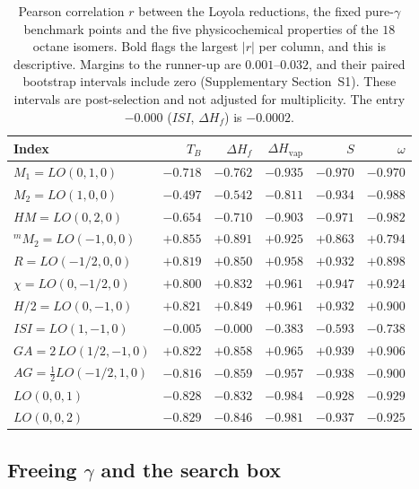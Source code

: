 \documentclass[a5paper, 10pt]{article}
\theoremstyle{plain}
\theoremstyle{remark}
\theoremstyle{definition}
\begin{document}
\begin{table}[htbp]
\centering
\caption{Pearson correlation $r$ between the Loyola reductions, the fixed pure-$\gamma$ benchmark points and the five physicochemical properties of the $18$ octane isomers. Bold flags the largest $|r|$ per column, and this is descriptive. Margins to the runner-up are $0.001$--$0.032$, and their paired bootstrap intervals include zero (Supplementary Section~S1). These intervals are post-selection and not adjusted for multiplicity. The entry $-0.000$ ($ISI$, $\Delta H_f$) is $-0.0002$.}
\label{tab:lo_octane}
\small
\begin{tabular}{lrrrrr}
\toprule
Index & $T_B$ & $\Delta H_f$ & $\Delta H_{\mathrm{vap}}$ & $S$ & $\omega$\\
\midrule
$M_1 = LO(0,1,0)$ & $-0.718$ & $-0.762$ & $-0.935$ & $-0.970$ & $-0.970$\\
$M_2 = LO(1,0,0)$ & $-0.497$ & $-0.542$ & $-0.811$ & $-0.934$ & $\mathbf{-0.988}$\\
$HM = LO(0,2,0)$ & $-0.654$ & $-0.710$ & $-0.903$ & $\mathbf{-0.971}$ & $-0.982$\\
${}^{m}\!M_2 = LO(-1,0,0)$ & $\mathbf{+0.855}$ & $\mathbf{+0.891}$ & $+0.925$ & $+0.863$ & $+0.794$\\
$R = LO(-1/2,0,0)$ & $+0.819$ & $+0.850$ & $+0.958$ & $+0.932$ & $+0.898$\\
$\chi = LO(0,-1/2,0)$ & $+0.800$ & $+0.832$ & $+0.961$ & $+0.947$ & $+0.924$\\
$H/2 = LO(0,-1,0)$ & $+0.821$ & $+0.849$ & $+0.961$ & $+0.932$ & $+0.900$\\
$ISI = LO(1,-1,0)$ & $-0.005$ & $-0.000$ & $-0.383$ & $-0.593$ & $-0.738$\\
$GA = 2\,LO(1/2,-1,0)$ & $+0.822$ & $+0.858$ & $+0.965$ & $+0.939$ & $+0.906$\\
$AG = \tfrac12 LO(-1/2,1,0)$ & $-0.816$ & $-0.859$ & $-0.957$ & $-0.938$ & $-0.900$\\
$LO(0,0,1)$ & $-0.828$ & $-0.832$ & $\mathbf{-0.984}$ & $-0.928$ & $-0.929$\\
$LO(0,0,2)$ & $-0.829$ & $-0.846$ & $-0.981$ & $-0.937$ & $-0.925$\\
\bottomrule
\end{tabular}
\end{table}

\subsection{Freeing $\gamma$ and the search box}\label{sec:ablation}
\end{document}
